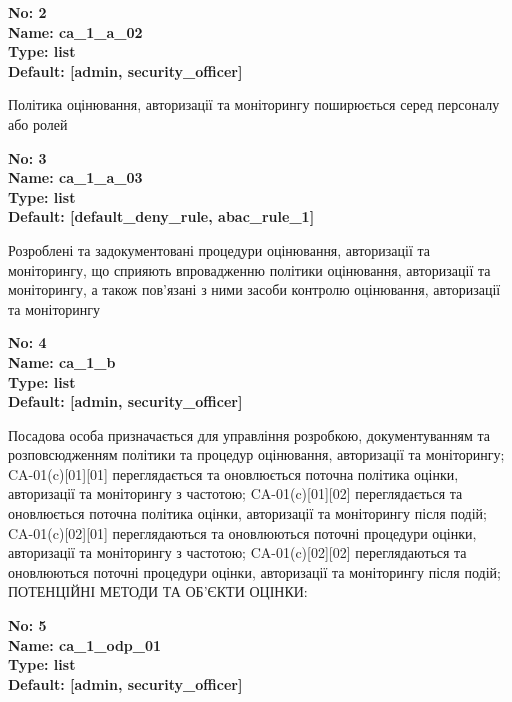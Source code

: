 \documentclass{article}
\begin{document}
{\footnotesize\bfseries
No: 2\\
Name: ca\_\allowbreak{}1\_\allowbreak{}a\_\allowbreak{}02\\
Type: list\\
Default: [\textquotedbl{}admin\textquotedbl{}, \textquotedbl{}security\_\allowbreak{}officer\textquotedbl{}]
}

{\footnotesize Політика оцінювання, авторизації та моніторингу поширюється серед персоналу або ролей}


{\footnotesize\bfseries
No: 3\\
Name: ca\_\allowbreak{}1\_\allowbreak{}a\_\allowbreak{}03\\
Type: list\\
Default: [\textquotedbl{}default\_\allowbreak{}deny\_\allowbreak{}rule\textquotedbl{}, \textquotedbl{}abac\_\allowbreak{}rule\_\allowbreak{}1\textquotedbl{}]
}

{\footnotesize Розроблені та задокументовані процедури оцінювання, авторизації та моніторингу, що сприяють впровадженню політики оцінювання, авторизації та моніторингу, а також пов'язані з ними засоби контролю оцінювання, авторизації та моніторингу}


{\footnotesize\bfseries
No: 4\\
Name: ca\_\allowbreak{}1\_\allowbreak{}b\\
Type: list\\
Default: [\textquotedbl{}admin\textquotedbl{}, \textquotedbl{}security\_\allowbreak{}officer\textquotedbl{}]
}

{\footnotesize Посадова особа призначається для управління розробкою, документуванням та розповсюдженням політики та процедур оцінювання, авторизації та моніторингу; CA-01(c)[01][01] переглядається та оновлюється поточна політика оцінки, авторизації та моніторингу з частотою; CA-01(c)[01][02] переглядається та оновлюється поточна політика оцінки, авторизації та моніторингу після подій; CA-01(c)[02][01] переглядаються та оновлюються поточні процедури оцінки, авторизації та моніторингу з частотою; CA-01(c)[02][02] переглядаються та оновлюються поточні процедури оцінки, авторизації та моніторингу після подій; ПОТЕНЦІЙНІ МЕТОДИ ТА ОБ'ЄКТИ ОЦІНКИ:}


{\footnotesize\bfseries
No: 5\\
Name: ca\_\allowbreak{}1\_\allowbreak{}odp\_\allowbreak{}01\\
Type: list\\
Default: [\textquotedbl{}admin\textquotedbl{}, \textquotedbl{}security\_\allowbreak{}officer\textquotedbl{}]
}
\end{document}

